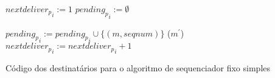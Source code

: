 \begin{algorithm}
\DontPrintSemicolon
{}

${{nextdeliver}_p}_{i} := 1$\;
${{pending}_p}_{i} := \emptyset$\;

 {
  ${{pending}_p}_{i} := {{pending}_p}_{i} \cup \{(m, seqnum)\}$\;
   {
    (${m}^{\prime}$)\;
    ${{nextdeliver}_p}_{i} := {{nextdeliver}_p}_{i} + 1$\;
  }
}
\caption{Código dos destinatários para o algoritmo de sequenciador fixo simples
\cite{journals/csur/DefagoSU04}}
\label{algo:simple-fixed-sequencer-destinations}
\end{algorithm}
